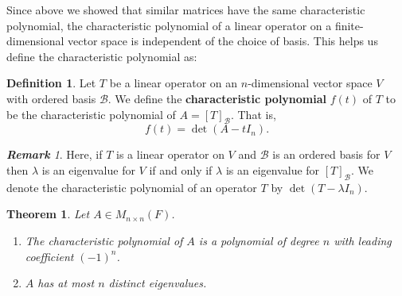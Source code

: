 \documentclass[12pt, a4paper]{article}
\newtheorem{theorem}{Theorem}[section]
\theoremstyle{definition}
\newtheorem{definition}{Definition}[section]
\theoremstyle{remark}
\newtheorem*{remark}{\textbf{Remark}}
\newcommand{\B}{\mathscr{B}}
\begin{document}
Since above we showed that similar matrices have the same characteristic polynomial, the characteristic polynomial of a linear operator on a finite-dimensional vector space is independent of the choice of basis. This helps us define the characteristic polynomial as:

\begin{definition}
Let $T$ be a linear operator on an $n$-dimensional vector space $V$ with ordered basis $\B$. We define the \textbf{characteristic polynomial} $f(t)$ of $T$ to be the characteristic polynomial of $A = [T]_\B$. That is,
\[
f(t) = \det(A - t I_n).
\]
\end{definition}

\begin{remark}
    Here, if $T$ is a linear operator on $V$ and $\B$ is an ordered basis for $V$ then $\lambda$ is an eigenvalue for $V$ if and only if $\lambda$ is an eigenvalue for $[T]_\B$. We denote the characteristic polynomial of an operator $T$ by $\det(T - \lambda I_n)$.
\end{remark}

\begin{theorem}
Let $A \in M_{n \times n}(F)$.
\begin{enumerate}
    \item The characteristic polynomial of $A$ is a polynomial of degree $n$ with leading coefficient $(-1)^n$.
    \item $A$ has at most $n$ distinct eigenvalues.
\end{enumerate}
\end{theorem}
\end{document}
